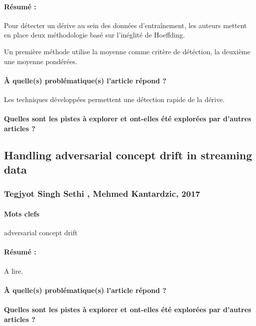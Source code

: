 \documentclass[11pt,a4paper]{report}
\begin{document}
\paragraph{Résumé :} Pour détecter un dérive au sein des données d'entraînement, les auteurs mettent en place deux méthodologie basé sur l'inéglité de Hoeffding.

Un première méthode utilise la moyenne comme critère de détéction, la deuxième une moyenne pondérées.

\paragraph{À quelle(s) problématique(s) l'article répond ?} Les techniques développées permettent une détection rapide de la dérive. 

\paragraph{Quelles sont les pistes à explorer et ont-elles  été explorées par d'autres articles ?}










\subsection{Handling adversarial concept drift in streaming data}
\subsubsection{Tegjyot Singh Sethi , Mehmed Kantardzic, 2017}

\paragraph{Mots clefs}  adversarial concept drift 

\paragraph{Résumé :} A lire.

\paragraph{À quelle(s) problématique(s) l'article répond ?}

\paragraph{Quelles sont les pistes à explorer et ont-elles  été explorées par d'autres articles ?}
\end{document}
